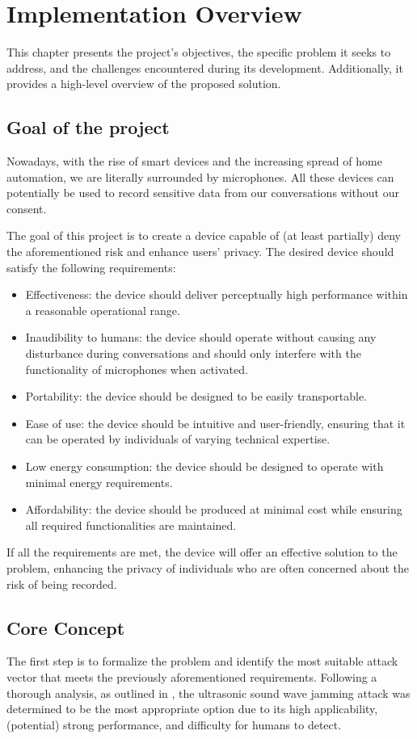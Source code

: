\chapter{Implementation Overview}
\label{overview}
This chapter presents the project's objectives, the specific problem it seeks to address, and the challenges encountered during its development. 
Additionally, it provides a high-level overview of the proposed solution.

\section{Goal of the project}
Nowadays, with the rise of smart devices and the increasing spread of home automation, we are literally surrounded by microphones.
All these devices can potentially be used to record sensitive data from our conversations without our consent.

The goal of this project is to create a device capable of (at least partially) deny the aforementioned risk and enhance users' privacy.
The desired device should satisfy the following requirements:
\begin{itemize}
    \item Effectiveness: the device should deliver perceptually high performance within a reasonable operational range.
    \item Inaudibility to humans: the device should operate without causing any disturbance during conversations and should only interfere with the functionality of microphones when activated.
    \item Portability: the device should be designed to be easily transportable.
    \item Ease of use: the device should be intuitive and user-friendly, ensuring that it can be operated by individuals of varying technical expertise.
    \item Low energy consumption: the device should be designed to operate with minimal energy requirements.
    \item Affordability: the device should be produced at minimal cost while ensuring all required functionalities are maintained.
\end{itemize}
If all the requirements are met, the device will offer an effective solution to the problem, enhancing the privacy of individuals who are often concerned about the risk of being recorded.

\section{Core Concept}
The first step is to formalize the problem and identify the most suitable attack vector that meets the previously aforementioned requirements.
Following a thorough analysis, as outlined in , the ultrasonic sound wave jamming attack was determined to be the most appropriate option due to its high applicability, (potential) strong performance, and difficulty for humans to detect.

